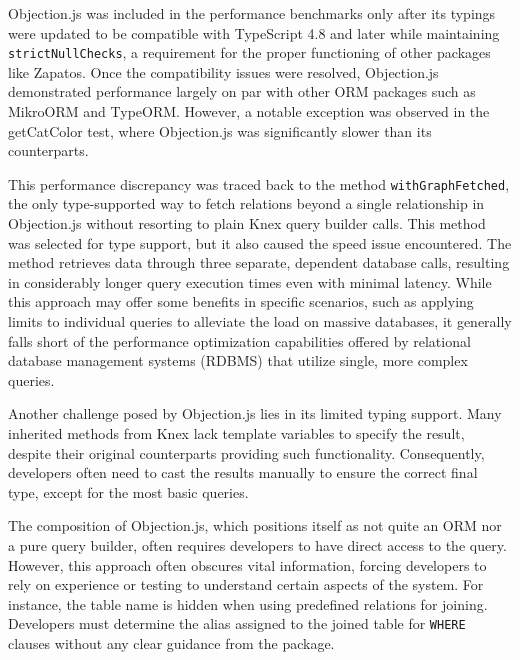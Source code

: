 Objection.js was included in the performance benchmarks only after its typings
were updated to be compatible with TypeScript 4.8 and later while maintaining
\texttt{strictNullChecks}, a requirement for the proper functioning of other
packages like Zapatos. Once the compatibility issues were resolved, Objection.js
demonstrated performance largely on par with other ORM packages such as MikroORM
and TypeORM. However, a notable exception was observed in the getCatColor test,
where Objection.js was significantly slower than its counterparts.

This performance discrepancy was traced back to the method
\texttt{withGraphFetched}, the only type-supported way to fetch relations beyond
a single relationship in Objection.js without resorting to plain Knex query
builder calls. This method was selected for type support, but it also caused the
speed issue encountered. The method retrieves data through three separate,
dependent database calls, resulting in considerably longer query execution times
even with minimal latency. While this approach may offer some benefits in
specific scenarios, such as applying limits to individual queries to alleviate
the load on massive databases, it generally falls short of the performance
optimization capabilities offered by relational database management systems
(RDBMS) that utilize single, more complex queries.

Another challenge posed by Objection.js lies in its limited typing support. Many
inherited methods from Knex lack template variables to specify the result,
despite their original counterparts providing such functionality. Consequently,
developers often need to cast the results manually to ensure the correct final
type, except for the most basic queries.

The composition of Objection.js, which positions itself as not quite an ORM nor
a pure query builder, often requires developers to have direct access to the
query. However, this approach often obscures vital information, forcing
developers to rely on experience or testing to understand certain aspects of the
system. For instance, the table name is hidden when using predefined relations
for joining. Developers must determine the alias assigned to the joined table
for \texttt{WHERE} clauses without any clear guidance from the package.